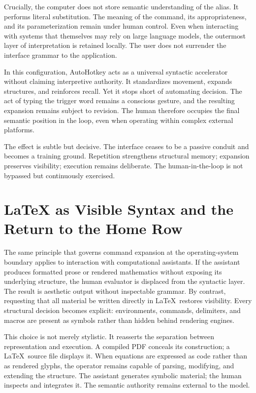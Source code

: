 \documentclass[11pt]{article}
\begin{document}
Crucially, the computer does not store semantic understanding of the alias. It performs literal substitution. The meaning of the command, its appropriateness, and its parameterization remain under human control. Even when interacting with systems that themselves may rely on large language models, the outermost layer of interpretation is retained locally. The user does not surrender the interface grammar to the application.

In this configuration, AutoHotkey acts as a universal syntactic accelerator without claiming interpretive authority. It standardizes movement, expands structures, and reinforces recall. Yet it stops short of automating decision. The act of typing the trigger word remains a conscious gesture, and the resulting expansion remains subject to revision. The human therefore occupies the final semantic position in the loop, even when operating within complex external platforms.

The effect is subtle but decisive. The interface ceases to be a passive conduit and becomes a training ground. Repetition strengthens structural memory; expansion preserves visibility; execution remains deliberate. The human-in-the-loop is not bypassed but continuously exercised.

\section{LaTeX as Visible Syntax and the Return to the Home Row}

The same principle that governs command expansion at the operating-system boundary applies to interaction with computational assistants. If the assistant produces formatted prose or rendered mathematics without exposing its underlying structure, the human evaluator is displaced from the syntactic layer. The result is aesthetic output without inspectable grammar. By contrast, requesting that all material be written directly in \LaTeX\ restores visibility. Every structural decision becomes explicit: environments, commands, delimiters, and macros are present as symbols rather than hidden behind rendering engines.

This choice is not merely stylistic. It reasserts the separation between representation and execution. A compiled PDF conceals its construction; a \LaTeX\ source file displays it. When equations are expressed as code rather than as rendered glyphs, the operator remains capable of parsing, modifying, and extending the structure. The assistant generates symbolic material; the human inspects and integrates it. The semantic authority remains external to the model.
\end{document}

